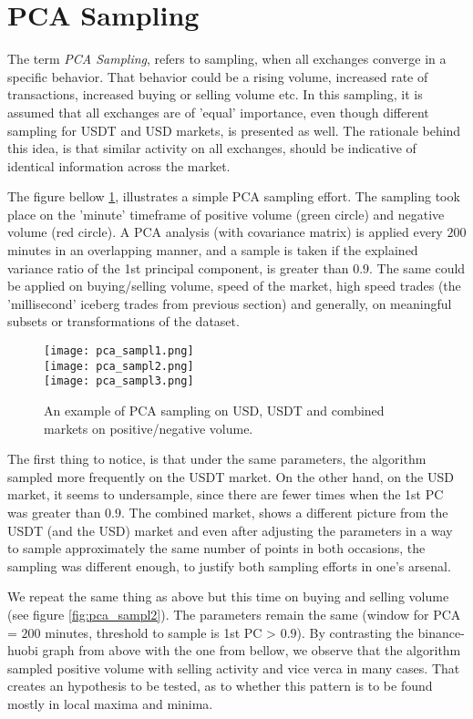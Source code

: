 \section{PCA Sampling}

The term \textit{PCA Sampling}, refers to sampling, when all exchanges converge in a specific behavior. That behavior could be a rising volume, increased rate of transactions, increased buying or selling volume etc. In this sampling, it is assumed that all exchanges are of 'equal' importance, even though different sampling for USDT and USD markets, is presented as well. The rationale behind this idea, is that similar activity on all exchanges, should be indicative of identical information across the market.

The figure bellow \ref{fig:pca_sampl1}, illustrates a simple PCA sampling effort. The sampling took place on the 'minute' timeframe of positive volume (green circle) and negative volume (red circle). A PCA analysis (with covariance matrix) is applied every \(200\) minutes in an overlapping manner, and a sample is taken if the explained variance ratio of the 1st principal component, is greater than \(0.9\). The same could be applied on buying/selling volume, speed of the market, high speed trades (the 'millisecond' iceberg trades from previous section) and generally, on meaningful subsets or transformations of the dataset.

 
\begin{figure}[H]
	\centering
    \texttt{[image: pca\_sampl1.png]} \\
    \texttt{[image: pca\_sampl2.png]} \\
    \texttt{[image: pca\_sampl3.png]}
	\caption{An example of PCA sampling on USD, USDT and combined markets on positive/negative volume.}
    \label{fig:pca_sampl1}
\end{figure}

The first thing to notice, is that under the same parameters, the algorithm sampled more frequently on the USDT market. On the other hand, on the USD market, it seems to undersample, since there are fewer times when the 1st PC was greater than \(0.9\). The combined market, shows a different picture from the USDT (and the USD) market and even after adjusting the parameters in a way to sample approximately the same number of points in both occasions, the sampling was different enough, to justify both sampling efforts in one's arsenal.

We repeat the same thing as above but this time on buying and selling volume (see figure \ref{fig:pca_sampl2}). The parameters remain the same (window for PCA = \(200\) minutes, threshold to sample is 1st PC > \(0.9\)). By contrasting the binance-huobi graph from above with the one from bellow, we observe that the algorithm sampled positive volume with selling activity and vice verca in many cases. That creates an hypothesis to be tested, as to whether this pattern is to be found mostly in local maxima and minima.



